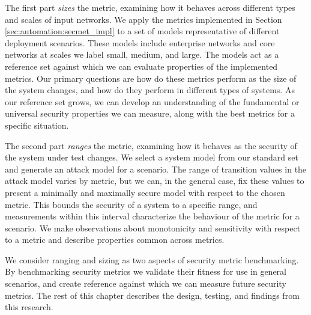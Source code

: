 The first part \textit{sizes} the metric, examining how it behaves across different types and scales of input networks. We apply the metrics implemented in Section \ref{sec:automation:secmet_impl} to a set of models representative of different deployment scenarios. These models include enterprise networks and core networks at scales we label small, medium, and large. The models  act as a reference set against which we can evaluate properties of the implemented metrics. Our primary questions are how do these metrics perform as the size of the system changes, and how do they perform in different types of systems. As our reference set grows, we can develop an understanding of the fundamental or universal security properties we can measure, along with the best metrics for a specific situation. 

The second part \textit{ranges} the metric, examining how it behaves as the security of the system under test changes. We select a system model from our standard set and generate an attack model for a scenario. The range of transition values in the attack model varies by metric, but we can, in the general case, fix these values to present a minimally and maximally secure model with respect to the chosen metric. This bounds the security of a system to a specific range, and measurements within this interval characterize the behaviour of the metric for a scenario. We make observations about monotonicity and sensitivity with respect to a metric and describe properties common across metrics. 

We consider ranging and sizing as two aspects of security metric benchmarking. By benchmarking security metrics we validate their fitness for use in general scenarios, and create reference against which we can measure future security metrics. The rest of this chapter describes the design, testing, and findings from this research. 